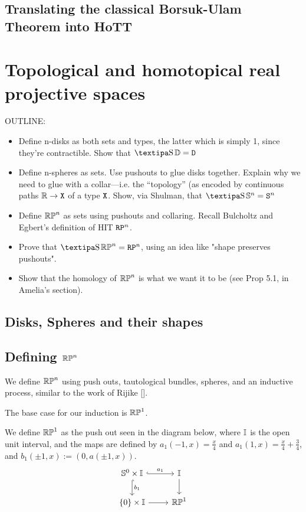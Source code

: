 \documentclass{amsart}
\begin{document}
\subsection{ Translating the classical Borsuk-Ulam Theorem into HoTT}


\section{Topological and homotopical real projective spaces}
\label{sec:rpn}

OUTLINE:
\begin{itemize}
\item
  Define n-disks as both sets and types, the latter which is
  simply 1, since they're contractible. Show that $ \shape
  \DD = \D $ 
\item
  Define n-spheres as sets.  Use pushouts to glue
  disks together. Explain why we need to glue with a
  collar---i.e. the ``topology'' (as encoded by continuous
  paths $ \mathbb{R} \to \mathtt{X} $ of a type $ \mathtt{X} $. Show, via Shulman,
  that $ \shape \SS^n = \S^n $ 
\item
  Define $ \mathbb{RP}^n $ as sets using pushouts and collaring.
  Recall Bulcholtz and Egbert's definition of HIT $ \mathtt{RP}^n
  $. 
 \item
  Prove that $ \shape \set{RP}^n = \RP^n $, using an idea like "shape preserves pushouts".
\item
Show that the homology of $\mathbb{RP}^n$ is what we want it to be (see Prop 5.1, in Amelia's section).
\end{itemize}

\subsection{Disks, Spheres and their shapes}
\subsection{Defining $\mathbb{RP}^n$}
We define $\mathbb{RP}^n$ using push outs, tautological bundles, spheres, and an inductive process, similar to the work of Rijike [].

The base case for our induction is $\mathbb{RP}^1$.

\begin{definition}
We define $\mathbb{RP}^1$ as the push out seen in the diagram below, where $\mathbb{I}$ is the open unit interval, and the maps are defined by $a_1(-1,x) = \frac{x}{4}$ and $a_1(1,x)= \frac{x}{4} + \frac{3}{4}$, and $b_1 (\pm 1, x) := (0, a(\pm1, x))$.\\
\[\begin{tikzcd}
\set{S}^0 \times \set{I} \arrow[r, hook, "a_1"] \arrow[d, hook, "b_1" ] & \set{I} \arrow[d]\\
\{0 \} \times \set{I} \arrow[r] & \set{RP}^1
\end{tikzcd}
\]
\end{definition}
\end{document}
